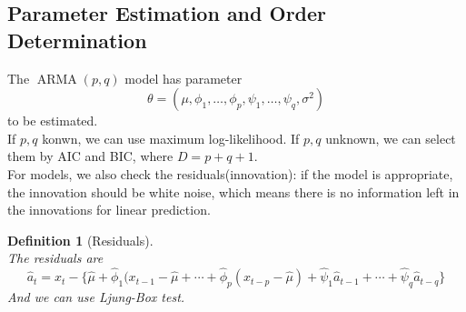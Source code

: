 \documentclass[12pt]{article}
\newtheorem{definition}{Definition}[section]
\theoremstyle{definition}
\DeclareMathOperator{\ARMA}{ARMA}
\begin{document}
\subsection{Parameter Estimation and Order Determination}
The $\ARMA(p,q)$ model has parameter 
\[
\theta = (\mu, \phi_1,\ldots, \phi_p, \psi_1,\ldots, \psi_q, \sigma^2)
\]
to be estimated. \\
If $p, q$ konwn, we can use maximum log-likelihood. If $p,q$ unknown, we can select them by AIC and BIC, where $D=p+ q + 1$.\\
For models, we also check the residuals(innovation): if the model is appropriate, the innovation should be white noise, which means there is no information left in the innovations for linear prediction.
\begin{definition}[Residuals]
\hfill\\\normalfont The residuals are
\[
\hat{a}_t = x_t -\{\hat{\mu} + \hat{\phi}_1(x_{t-1}-\hat{\mu} + \cdots + \hat{\phi}_p(x_{t-p}-\hat{\mu}) + \hat{\psi}_1\hat{a}_{t-1} + \cdots + \hat{\psi}_q\hat{a}_{t-q}\}
\]
And we can use Ljung-Box test.
\end{definition}
\end{document}
